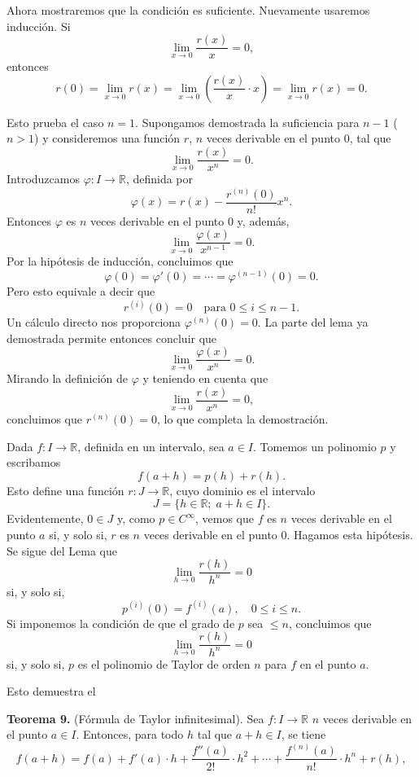 \documentclass[12pt,oneside]{book}
\begin{document}
Ahora mostraremos que la condición es suficiente. Nuevamente usaremos inducción. Si  
\[
\lim_{x \to 0} \frac{r(x)}{x} = 0,
\]  
entonces  
\[
r(0) = \lim_{x \to 0} r(x) = \lim_{x \to 0} \left( \frac{r(x)}{x} \cdot x \right) = \lim_{x \to 0} r(x) = 0.
\]

Esto prueba el caso \( n = 1 \). Supongamos demostrada la suficiencia para \( n - 1 \) (\( n > 1 \)) y consideremos una función \( r \), \( n \) veces derivable en el punto \( 0 \), tal que
\[
\lim_{x \to 0} \frac{r(x)}{x^n} = 0.
\]
Introduzcamos \( \varphi: I \to \mathbb{R} \), definida por
\[
\varphi(x) = r(x) - \frac{r^{(n)}(0)}{n!} x^n.
\]
Entonces \( \varphi \) es \( n \) veces derivable en el punto \( 0 \) y, además,
\[
\lim_{x \to 0} \frac{\varphi(x)}{x^{n-1}} = 0.
\]
Por la hipótesis de inducción, concluimos que
\[
\varphi(0) = \varphi'(0) = \cdots = \varphi^{(n-1)}(0) = 0.
\]
Pero esto equivale a decir que
\[
r^{(i)}(0) = 0 \quad \text{para } 0 \le i \le n - 1.
\]
Un cálculo directo nos proporciona \( \varphi^{(n)}(0) = 0 \). La parte del lema ya demostrada permite entonces concluir que
\[
\lim_{x \to 0} \frac{\varphi(x)}{x^n} = 0.
\]
Mirando la definición de \( \varphi \) y teniendo en cuenta que
\[
\lim_{x \to 0} \frac{r(x)}{x^n} = 0,
\]
concluimos que \( r^{(n)}(0) = 0 \), lo que completa la demostración.

Dada \( f: I \to \mathbb{R} \), definida en un intervalo, sea \( a \in I \). Tomemos un polinomio \( p \) y escribamos
\[
f(a + h) = p(h) + r(h).
\]
Esto define una función \( r: J \to \mathbb{R} \), cuyo dominio es el intervalo
\[
J = \{h \in \mathbb{R}; \; a + h \in I\}.
\]
Evidentemente, \( 0 \in J \) y, como \( p \in C^\infty \), vemos que \( f \) es \( n \) veces derivable en el punto \( a \) si, y solo si, \( r \) es \( n \) veces derivable en el punto \( 0 \). Hagamos esta hipótesis. Se sigue del Lema que
\[
\lim_{h \to 0} \frac{r(h)}{h^n} = 0
\]
si, y solo si,
\[
p^{(i)}(0) = f^{(i)}(a), \quad 0 \le i \le n.
\]
Si imponemos la condición de que el grado de \( p \) sea \( \le n \), concluimos que
\[
\lim_{h \to 0} \frac{r(h)}{h^n} = 0
\]
si, y solo si, \( p \) es el polinomio de Taylor de orden \( n \) para \( f \) en el punto \( a \).

Esto demuestra el

\textbf{Teorema 9.} (Fórmula de Taylor infinitesimal). Sea \( f: I \to \mathbb{R} \) \( n \) veces derivable en el punto \( a \in I \). Entonces, para todo \( h \) tal que \( a + h \in I \), se tiene
\[
f(a + h) = f(a) + f'(a) \cdot h + \frac{f''(a)}{2!} \cdot h^2 + \cdots + \frac{f^{(n)}(a)}{n!} \cdot h^n + r(h),
\]
\end{document}
